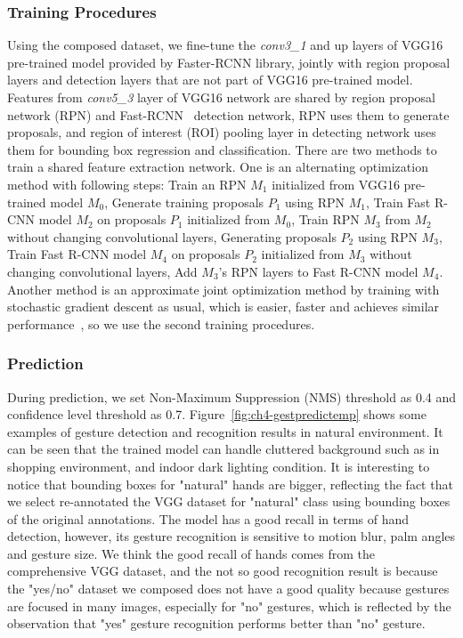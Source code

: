 \subsubsection{Training Procedures}
Using the composed dataset, we fine-tune the \emph{conv3\_1} and up layers of VGG16 pre-trained model provided by Faster-RCNN library, jointly with region proposal layers and detection layers that are not part of VGG16 pre-trained model. Features from \emph{conv5\_3} layer of VGG16 network are shared by region proposal network (RPN) and Fast-RCNN~\cite{girshick2015fast} detection network, RPN uses them to generate proposals, and region of interest (ROI) pooling layer in detecting network uses them for bounding box regression and classification. There are two methods to train a shared feature extraction network. One is an alternating optimization method with following steps:  Train an RPN $M_1$ initialized from VGG16 pre-trained model $M_0$,  Generate training proposals $P_1$ using RPN $M_1$,  Train Fast R-CNN model $M_2$ on proposals $P_1$ initialized from $M_0$,  Train RPN $M_3$ from $M_2$ without changing convolutional layers,  Generating proposals $P_2$ using RPN $M_3$,  Train Fast R-CNN model $M_4$ on proposals $P_2$ initialized from $M_3$ without changing convolutional layers,  Add $M_3$'s RPN layers to Fast R-CNN model $M_4$. Another method is an approximate joint optimization method by training with stochastic gradient descent as usual, which is easier, faster and achieves similar performance~\cite{links:pyfasterrcnn}, so we use the second training procedures.

\subsubsection{Prediction}
During prediction, we set Non-Maximum Suppression (NMS) threshold as 0.4 and confidence level threshold as 0.7. Figure~\ref{fig:ch4-gestpredictemp} shows some examples of gesture detection and recognition results in natural environment. It can be seen that the trained model can handle cluttered background such as in shopping environment, and indoor dark lighting condition. It is interesting to notice that bounding boxes for "natural" hands are bigger, reflecting the fact that we select re-annotated the VGG dataset for "natural" class using bounding boxes of the original annotations. The model has a good recall in terms of hand detection, however, its gesture recognition is sensitive to motion blur, palm angles and gesture size. We think the good recall of hands comes from the comprehensive VGG dataset, and the not so good recognition result is because the "yes/no" dataset we composed does not have a good quality because gestures are focused in many images, especially for "no" gestures, which is reflected by the observation that "yes" gesture recognition performs better than "no" gesture.


